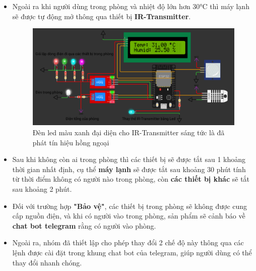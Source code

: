 \documentclass{report}
\begin{document}
\begin{itemize}
    \pagebreak
    \item Ngoài ra khi người dùng trong phòng và nhiệt độ lớn hơn 30°C thì máy lạnh sẽ được tự động mở thông qua thiết bị \textbf{IR-Transmitter}.

    \begin{figure}[!h]
        \centering
        \includegraphics[width=\textwidth, keepaspectratio]{img/mlanh_mo.png}
        \caption{Đèn led màu xanh đại diện cho IR-Transmitter sáng tức là đã phát tín hiệu hồng ngoại}
    \end{figure}

    \item Sau khi không còn ai trong phòng thì các thiết bị sẽ được tắt sau 1 khoảng thời gian nhất định, cụ thể  \textbf{máy lạnh} sẽ được tắt sau khoảng 30 phút tính từ thời điểm không có người nào trong phòng, còn \textbf{các thiết bị khác} sẽ tắt sau khoảng 2 phút.

    \item Đối với trường hợp \textbf{"Bảo vệ"}, các thiết bị trong phòng sẽ không được cung cấp nguồn điện, và khi có người vào trong phòng, sản phẩm sẽ cảnh báo về \textbf{chat bot telegram} rằng có người vào phòng.

    \item Ngoài ra, nhóm đã thiết lập cho phép thay đổi 2 chế độ này thông qua các lệnh được cài đặt trong khung chat bot của telegram, giúp người dùng có thể thay đổi nhanh chóng.
\end{itemize}


\newpage
\end{document}

